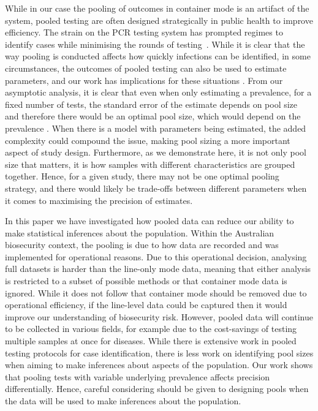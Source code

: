 \documentclass[aoas]{imsart}
\begin{document}
While in our case the pooling of outcomes in container mode is an artifact of the system, pooled testing are often designed strategically in public health to improve efficiency. The strain on the PCR testing system has prompted regimes to identify cases while minimising the rounds of testing~\cite{mutesa_pooled_2021}. While it is clear that the way pooling is conducted affects how quickly infections can be identified,  {in some circumstances, the outcomes of pooled testing can also be used to estimate parameters, and our work has implications for these situations} \cite{delaigle_nonparametric_2015, chatterjee_regression_2020, mcmahan_bayesian_2017, liu_generalized_2020}. From our asymptotic analysis, it is clear that even when only estimating a prevalence, for a fixed number of tests, the standard error of the estimate depends on pool size and therefore there would be an optimal pool size, which would depend on the prevalence  \cite{keeling2022modeling}. When there is a model with parameters being estimated, the added complexity could compound the issue, making pool sizing a more important aspect of study design. Furthermore, as we demonstrate here, it is not only pool size that matters, it is how samples with different characteristics are grouped together. Hence, for a given study, there may not be one optimal pooling strategy, and there would likely be trade-offs between different parameters when it comes to maximising the precision of estimates. 


 {In this paper we have investigated how pooled data can reduce our ability to make statistical inferences about the population. Within the Australian biosecurity context, the pooling is due to how data are recorded and was implemented for operational reasons. Due to this operational decision, analysing full datasets is harder than the line-only mode data, meaning that either analysis is restricted to a subset of possible methods or that container mode data is ignored. While it does not follow that container mode should be removed due to operational efficiency, if the line-level data could be captured then it would improve our understanding of biosecurity risk. 
However, pooled data will continue to be collected in various fields, for example due to the cost-savings of testing multiple samples at once for diseases.
While there is extensive work in pooled testing protocols for case identification, there is less work on identifying pool sizes when aiming to make inferences about aspects of the population.
Our work shows that pooling tests with variable underlying prevalence affects precision differentially. Hence, careful considering should be given to designing pools when the data will be used to make inferences about the population.}
\end{document}

